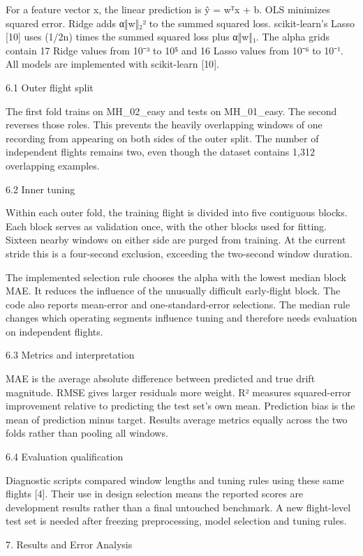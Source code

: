 \documentclass[
  11pt,
]{article}
\begin{document}
For a feature vector x, the linear prediction is ŷ = wᵀx + b. OLS minimizes squared error. Ridge adds α‖w‖₂² to the summed squared loss. scikit-learn's Lasso {[}10{]} uses (1/2n) times the summed squared loss plus α‖w‖₁. The alpha grids contain 17 Ridge values from 10⁻³ to 10⁵ and 16 Lasso values from 10⁻⁶ to 10⁻¹. All models are implemented with scikit-learn {[}10{]}.

6.1 Outer flight split

The first fold trains on MH\_02\_easy and tests on MH\_01\_easy. The second reverses those roles. This prevents the heavily overlapping windows of one recording from appearing on both sides of the outer split. The number of independent flights remains two, even though the dataset contains 1,312 overlapping examples.

6.2 Inner tuning

Within each outer fold, the training flight is divided into five contiguous blocks. Each block serves as validation once, with the other blocks used for fitting. Sixteen nearby windows on either side are purged from training. At the current stride this is a four-second exclusion, exceeding the two-second window duration.

The implemented selection rule chooses the alpha with the lowest median block MAE. It reduces the influence of the unusually difficult early-flight block. The code also reports mean-error and one-standard-error selections. The median rule changes which operating segments influence tuning and therefore needs evaluation on independent flights.

6.3 Metrics and interpretation

MAE is the average absolute difference between predicted and true drift magnitude. RMSE gives larger residuals more weight. R² measures squared-error improvement relative to predicting the test set's own mean. Prediction bias is the mean of prediction minus target. Results average metrics equally across the two folds rather than pooling all windows.

6.4 Evaluation qualification

Diagnostic scripts compared window lengths and tuning rules using these same flights {[}4{]}. Their use in design selection means the reported scores are development results rather than a final untouched benchmark. A new flight-level test set is needed after freezing preprocessing, model selection and tuning rules.

7. Results and Error Analysis
\end{document}
